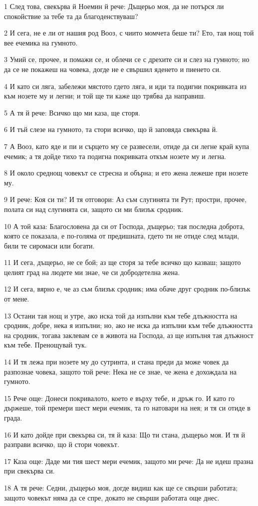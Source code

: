 \par 1 След това, свекърва й Ноемин й рече: Дъщерьо моя, да не потърся ли спокойствие за тебе та да благоденствуваш?
\par 2 И сега, не е ли от нашия род Вооз, с чиито момчета беше ти? Ето, тая нощ той вее ечемика на гумното.
\par 3 Умий се, прочее, и помажи се, и облечи се с дрехите си и слез на гумното; но да се не покажеш на човека, догде не е свършил яденето и пиенето си.
\par 4 И като си ляга, забележи мястото гдето ляга, и иди та подигни покривката из към нозете му и легни; и той ще ти каже що трябва да направиш.
\par 5 А тя й рече: Всичко що ми каза, ще сторя.
\par 6 И тъй слезе на гумното, та стори всичко, що й заповяда свекърва й.
\par 7 А Вооз, като яде и пи и сърцето му се развесели, отиде да си легне край купа ечемик; а тя дойде тихо та подигна покривката откъм нозете му и легна.
\par 8 И около среднощ човекът се стресна и обърна; и ето жена лежеше при нозете му.
\par 9 И рече: Коя си ти? И тя отговори: Аз съм слугинята ти Рут; простри, прочее, полата си над слугинята си, защото си ми близък сродник.
\par 10 А той каза: Благословена да си от Господа, дъщерьо; тая последна доброта, която се показала, е по-голяма от предишната, гдето ти не отиде след млади, били те сиромаси или богати.
\par 11 И сега, дъщерьо, не се бой; аз ще сторя за тебе всичко що казваш; защото целият град на людете ми знае, че си добродетелна жена.
\par 12 И сега, вярно е, че аз съм близък сродник; има обаче друг сродник по-близък от мене.
\par 13 Остани тая нощ и утре, ако иска той да изпълни към тебе длъжността на сродник, добре, нека я изпълни; но, ако не иска да изпълни към тебе длъжността на сродник, тогава заклевам се в живота на Господа, аз ще изпълня тая длъжност към тебе. Пренощувай тук.
\par 14 И тя лежа при нозете му до сутринта, и стана преди да може човек да разпознае човека, защото той рече: Нека не се знае, че жена е дохождала на гумното.
\par 15 Рече още: Донеси покривалото, което е върху тебе, и дръж го. И като го държеше, той премери шест мери ечемик, та го натовари на нея; и тя си отиде в града.
\par 16 И като дойде при свекърва си, тя й каза: Що ти стана, дъщерьо моя. И тя й разправи всичко, що й стори човекът.
\par 17 Каза още: Даде ми тия шест мери ечемик, защото ми рече: Да не идеш празна при свекърва си.
\par 18 А тя рече: Седни, дъщерьо моя, догде видиш как ще се свърши работата; защото човекът няма да се спре, докато не свърши работата още днес.

